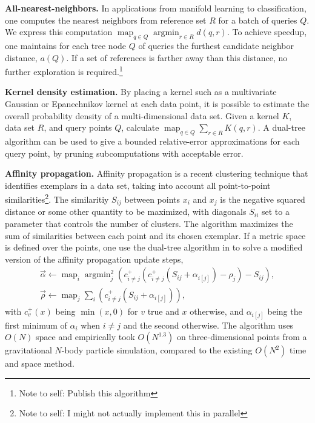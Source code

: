 \documentclass[times, leqno,twocolumn]{article}
\newcommand{\authornote}[1]{\footnote{Note to self: #1}}
\newcommand{\authorsnote}[1]{\authornote{#1}}
\DeclareMathOperator*{\map}{map}
\DeclareMathOperator*{\argmin}{argmin}
\newcommand{\ocpos}[1]{c^{+}_{#1}}
\newcommand{\cpos}[2]{\ocpos{#1 \neq #2}}
\newcommand{\simil}[2]{S_{#1#2}}
\newcommand{\vecrho}{\vec{\rho}}
\newcommand{\vecalpha}{\vec{\alpha}}
\newcommand{\frho}[1]{\rho_{#1}}
\newcommand{\falpha}[1]{\alpha_{#1}}
\newcommand{\falphaj}[2]{\alpha_{#1[#2]}}
\begin{document}
{\bf All-nearest-neighbors.}
In applications from manifold learning to classification, one computes the nearest neighbors from reference set $R$ for a batch of queries $Q$.
We express this computation $\map_{q \in Q} \argmin_{r \in R} d(q,r)$.
To achieve speedup, one maintains for each tree node $Q$ of queries the furthest candidate neighbor distance, $a(Q)$.
If a set of references is farther away than this distance, no further exploration is required.\authorsnote{Publish this algorithm}

{\bf Kernel density estimation.}
By placing a kernel such as a multivariate Gaussian or Epanechnikov kernel at each data point, it is possible to estimate the overall probability density of a multi-dimensional data set.
Given a kernel $K$, data set $R$, and query points $Q$, calculate $\map_{q \in Q} \sum_{r \in R} K(q, r)$.
A dual-tree algorithm \cite{gray_kde, dong_kde} can be used to give a bounded relative-error approximations for each query point, by pruning subcomputations with acceptable error.

{\bf Affinity propagation.}
Affinity propagation is a recent clustering technique that identifies exemplars in a data set, taking into account all point-to-point similarities\cite{affinity}\authorsnote{I might not actually implement this in parallel}.
The similaritiy $\simil{i}{j}$ between points $x_i$ and $x_j$ is the negative squared distance or some other quantity to be maximized, with diagonals $\simil{i}{i}$ set to a parameter that controls the number of clusters.
The algorithm maximizes the sum of similarities between each point and its chosen exemplar.
If a metric space is defined over the points, one use the dual-tree algorithm in \cite{ryan_nips} to solve a modified version of the affinity propagation update steps,
\[ \begin{array}{l}
  \vecalpha \gets \map_{i} \argmin^2_{j} \!\left( \cpos{i}{j}(\cpos{i}{j}(\simil{i}{j} + \falphaj{i}{j}) - \frho{j}) - \simil{i}{j} \right)\! ,
  \\
  \vecrho \gets \map_{j} \sum_{i} \!\left( \cpos{i}{j}(\simil{i}{j} + \falphaj{i}{j}) \right)\!,
\end{array} \]
\noindent with $\ocpos{v}(x)$ being $\min(x, 0)$ for $v$ true and $x$ otherwise, and $\falphaj{i}{j}$ being the first minimum of $\falpha{i}$ when $i \neq j$ and the second otherwise.
The algorithm uses $O(N)$ space and empirically took $O(N^{1.3})$ on three-dimensional points from a gravitational $N$-body particle simulation, compared to the existing $O(N^2)$ time and space method.
\end{document}
